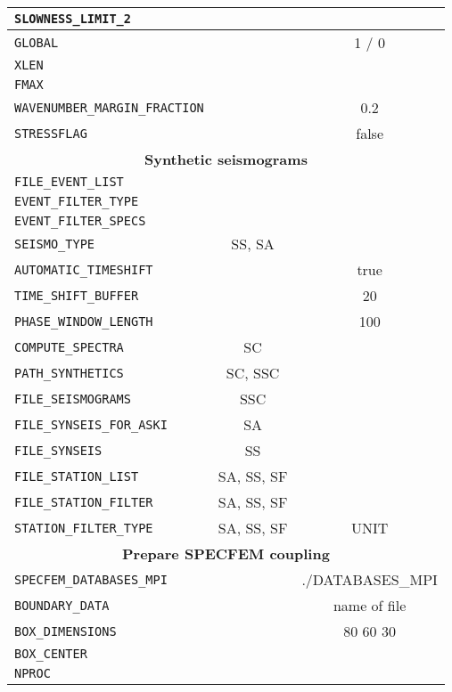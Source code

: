\begin{longtable}{|p{6.5cm}|c|c|}
   \verb+SLOWNESS_LIMIT_2+          & &  \\ \hline
   \verb+GLOBAL+                    & & 1 / 0 \\ \hline
   \verb+XLEN+                      & &  \\ \hline
   \verb+FMAX+                      & &  \\ \hline
   \verb+WAVENUMBER_MARGIN_FRACTION+& & 0.2 \\ \hline
   \verb+STRESSFLAG+                & & false \\ \hline
   \multicolumn{3}{|c|}{\textbf{Synthetic seismograms}} \\ \hline
	\verb+FILE_EVENT_LIST+           & &  \\ \hline
	\verb+EVENT_FILTER_TYPE+         & &  \\ \hline
	\verb+EVENT_FILTER_SPECS+        & &  \\ \hline
	\verb+SEISMO_TYPE+               & SS, SA &  \\ \hline
	\verb+AUTOMATIC_TIMESHIFT+       & & true \\ \hline
   \verb+TIME_SHIFT_BUFFER+         & & 20 \\ \hline
   \verb+PHASE_WINDOW_LENGTH+       & & 100 \\ \hline
	\verb+COMPUTE_SPECTRA+           & SC &  \\ \hline
	\verb+PATH_SYNTHETICS+           & SC, SSC &  \\ \hline
	\verb+FILE_SEISMOGRAMS+          & SSC &  \\ \hline
	\verb+FILE_SYNSEIS_FOR_ASKI+     & SA & \\ \hline
	\verb+FILE_SYNSEIS+              & SS & \\ \hline
	\verb+FILE_STATION_LIST+         & SA, SS, SF & \\ \hline
	\verb+FILE_STATION_FILTER+       & SA, SS, SF & \\ \hline
	\verb+STATION_FILTER_TYPE+       & SA, SS, SF & UNIT \\ \hline
   \multicolumn{3}{|c|}{\textbf{Prepare SPECFEM coupling}} \\ \hline
	\verb+SPECFEM_DATABASES_MPI+     & & ./DATABASES\_MPI \\ \hline
   \verb+BOUNDARY_DATA+             & & name of file \\ \hline
   \verb+BOX_DIMENSIONS+            & & 80 60 30 \\ \hline
   \verb+BOX_CENTER+                & &  \\ \hline
   \verb+NPROC+                     & &  \\ \hline

\end{longtable}
